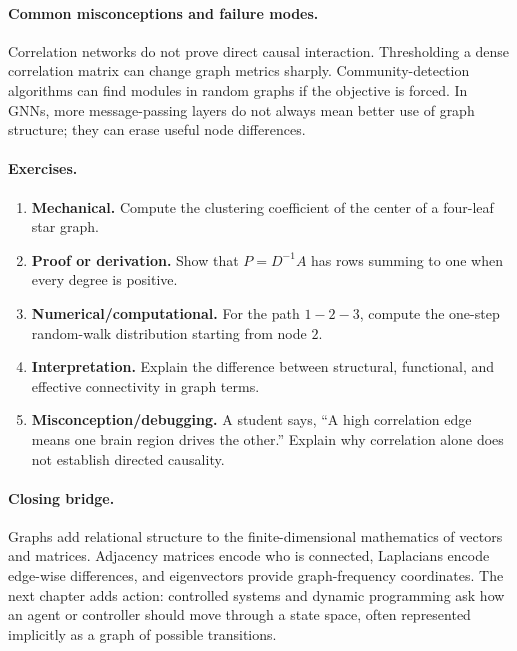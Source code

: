 \paragraph{Common misconceptions and failure modes.}
Correlation networks do not prove direct causal interaction. Thresholding a dense correlation matrix can change graph metrics sharply. Community-detection algorithms can find modules in random graphs if the objective is forced. In GNNs, more message-passing layers do not always mean better use of graph structure; they can erase useful node differences.

\paragraph{Exercises.}
\begin{enumerate}[label=\textbf{29.4.\arabic*.}, leftmargin=*]
\item \textbf{Mechanical.} Compute the clustering coefficient of the center of a four-leaf star graph.
\item \textbf{Proof or derivation.} Show that \(P=D^{-1}A\) has rows summing to one when every degree is positive.
\item \textbf{Numerical/computational.} For the path \(1-2-3\), compute the one-step random-walk distribution starting from node \(2\).
\item \textbf{Interpretation.} Explain the difference between structural, functional, and effective connectivity in graph terms.
\item \textbf{Misconception/debugging.} A student says, ``A high correlation edge means one brain region drives the other.'' Explain why correlation alone does not establish directed causality.
\end{enumerate}

\paragraph{Closing bridge.}
Graphs add relational structure to the finite-dimensional mathematics of vectors and matrices. Adjacency matrices encode who is connected, Laplacians encode edge-wise differences, and eigenvectors provide graph-frequency coordinates. The next chapter adds action: controlled systems and dynamic programming ask how an agent or controller should move through a state space, often represented implicitly as a graph of possible transitions.

\clearpage
